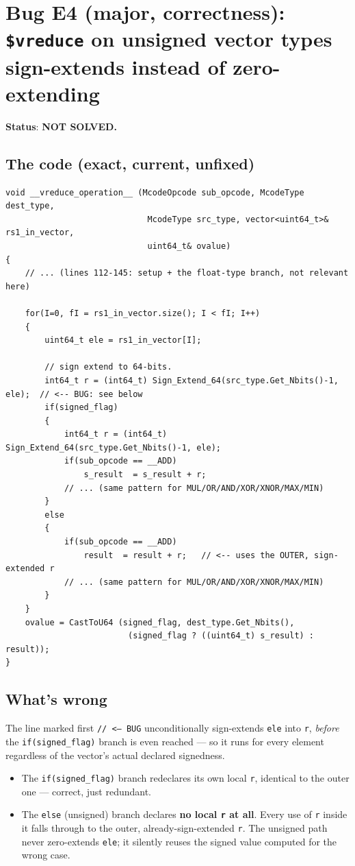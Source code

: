 \documentclass[11pt,a4paper]{report}
\begin{document}
\section{Bug E4 (major, correctness): \texttt{\$vreduce} on unsigned vector types sign-extends instead of zero-extending}

\textbf{Status}: \textbf{NOT SOLVED.}

\subsection*{The code (exact, current, unfixed)}
\begin{lstlisting}[caption={\texttt{McodeOperations.cpp}, lines 110, 146--198 --- \texttt{\_\_vreduce\_operation\_\_}}]
void __vreduce_operation__ (McodeOpcode sub_opcode, McodeType dest_type,
                             McodeType src_type, vector<uint64_t>& rs1_in_vector,
                             uint64_t& ovalue)
{
    // ... (lines 112-145: setup + the float-type branch, not relevant here)

    for(I=0, fI = rs1_in_vector.size(); I < fI; I++)
    {
        uint64_t ele = rs1_in_vector[I];

        // sign extend to 64-bits.
        int64_t r = (int64_t) Sign_Extend_64(src_type.Get_Nbits()-1, ele);  // <-- BUG: see below
        if(signed_flag)
        {
            int64_t r = (int64_t) Sign_Extend_64(src_type.Get_Nbits()-1, ele);
            if(sub_opcode == __ADD)
                s_result  = s_result + r;
            // ... (same pattern for MUL/OR/AND/XOR/XNOR/MAX/MIN)
        }
        else
        {
            if(sub_opcode == __ADD)
                result  = result + r;   // <-- uses the OUTER, sign-extended r
            // ... (same pattern for MUL/OR/AND/XOR/XNOR/MAX/MIN)
        }
    }
    ovalue = CastToU64 (signed_flag, dest_type.Get_Nbits(),
                         (signed_flag ? ((uint64_t) s_result) : result));
}
\end{lstlisting}

\subsection*{What's wrong}
The line marked first \texttt{// <-- BUG} unconditionally sign-extends \texttt{ele} into
\texttt{r}, \emph{before} the \texttt{if(signed\_flag)} branch is even reached --- so it runs
for every element regardless of the vector's actual declared signedness.
\begin{itemize}
  \item The \texttt{if(signed\_flag)} branch redeclares its own local \texttt{r}, identical
        to the outer one --- correct, just redundant.
  \item The \texttt{else} (unsigned) branch declares \textbf{no local \texttt{r} at all}.
        Every use of \texttt{r} inside it falls through to the outer,
        already-sign-extended \texttt{r}. The unsigned path never zero-extends \texttt{ele};
        it silently reuses the signed value computed for the wrong case.
\end{itemize}
\end{document}
